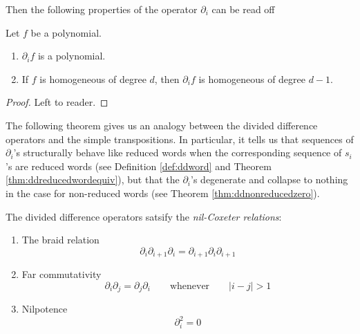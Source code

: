 \documentclass{article}
\begin{document}
Then the following properties of the operator $\partial_i$ can be read off

\begin{corollary} 
    Let $f$ be a polynomial.
    \begin{enumerate}[label=(\alph*)]
        \item $\partial_if$ is a polynomial.
        \item If $f$ is homogeneous of degree $d$, then $\partial_if$ is homogeneous of degree $d-1$.
    \end{enumerate}
\end{corollary}

\begin{proof}
    Left to reader.
\end{proof}

The following theorem gives us an analogy between the divided difference operators and the simple transpositions.
In particular, it tells us that sequences of $\partial_i$'s structurally behave like reduced words when the corresponding sequence of $s_i$'s are reduced words (see Definition \ref{def:ddword} and Theorem \ref{thm:ddreducedwordequiv}), but that the $\partial_i$'s degenerate and collapse to nothing in the case for non-reduced words (see Theorem \ref{thm:ddnonreducedzero}).

\begin{theorem}\label{thm:ddnilcoxeterrelations}
    The divided difference operators satsify the \textit{nil-Coxeter relations}:
    \begin{enumerate}[label=(\alph*)]
        \item The braid relation
            \begin{equation}\label{eq:ddbraid}
                \partial_i\partial_{i+1}\partial_i = \partial_{i+1}\partial_i\partial_{i+1}
            \end{equation}
        \item Far commutativity
            \begin{equation}\label{eq:ddcommute}
                \partial_i\partial_j = \partial_j\partial_i\qquad \text{whenever}\qquad|i-j| > 1
            \end{equation}
        \item Nilpotence
            \begin{equation}\label{eq:ddcontract}
                \partial_i^2 = 0
            \end{equation}
    \end{enumerate}
\end{theorem}
\end{document}
